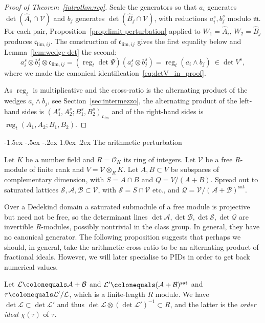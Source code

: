\documentclass[11pt,a4paper]{amsart}
\makeatletter
\renewcommand\subsection{\@startsection{subsection}{2}{\z@}
                                   {-1.5ex \@plus -.5ex \@minus -.2ex}%
                                   {1.0ex \@plus.2ex}%
                                   {\normalfont\itshape}}%
\newcommand{\xc}{\mathfrak{c}}
\newcommand{\xm}{\mathfrak{m}}
\DeclareMathOperator{\reg}{reg}
\newcommand{\sat}{{\operatorname{sat}}}
\theoremstyle{plain}
\theoremstyle{definition}
\theoremstyle{remark}
\newcommand{\ca}{\mathcal{A}}
\newcommand{\cb}{\mathcal{B}}
\newcommand{\cl}{\mathcal{L}}
\newcommand{\co}{\mathcal{O}}
\newcommand{\cq}{\mathcal{Q}}
\newcommand{\cs}{\mathcal{S}}
\newcommand{\cv}{\mathcal{V}}
\newcommand{\coleq}{\colonequals}
\newcommand{\xci}[1][]{\xc_{\mathrm{lim}#1}} %
\makeatother
\begin{document}
\begin{proof}[Proof of Theorem~\ref{introthm:reg}]
  Scale the generators so that $a_i$ generates $\det(\hat A_i \cap \cv)$ and $b_j$ generates
  $\det(\hat B_j \cap \cv)$, with reductions $a_i^s, b_j^s$ modulo $\xm$. For each pair,
  Proposition~\ref{prop:limit-perturbation} applied to $W_1 = \hat A_i$, $W_2 = \hat B_j$ produces
  $\xci[,ij]$. The construction of $\xci[,ij]$ gives the first equality below and Lemma~\ref{lem:wedge-det} the second:
  \[
    a_i^s \otimes b_j^s \otimes \xci[,ij] = (\reg_t \det \Psi)(a_i^s \otimes b_j^s) = \reg_t(a_i \wedge b_j) \ \in \det V^s,
  \]
  where we made the canonical identification~\eqref{eq:detV_in_proof}.

  As $\reg_t$ is multiplicative and the cross-ratio is the alternating product of the wedges $a_i \wedge b_j$, see Section~\ref{sec:intermezzo}, the alternating product of the left-hand sides is $(A_1^s, A_2^s; B_1^s, B_2^s)_{\xci}$ and of the right-hand sides is $\reg_t(A_1, A_2; B_1, B_2)$.
\end{proof}

\subsection{The arithmetic perturbation}

Let $K$ be a number field and $R = \co_K$ its ring of integers. Let $\cv$ be a free $R$-module of finite rank and $V = \cv \otimes_R K$. Let $A, B \subset V$ be subspaces of complementary dimension, with $S = A \cap B$ and $Q = V/(A+B)$. Spread out to saturated lattices $\cs, \ca, \cb \subset \cv$, with $\cs = S \cap \cv$ etc., and $\cq = \cv/(\ca + \cb)^{\sat}$.

Over a Dedekind domain a saturated submodule of a free module is projective but need not be free, so the determinant lines $\det \ca, \det \cb, \det \cs, \det \cq$ are invertible $R$-modules, possibly nontrivial in the class group. In general, they have no canonical generator. The following proposition suggests that perhaps we should, in general, take the arithmetic cross-ratio to be an alternating product of fractional ideals. However, we will later specialise to PIDs in order to get back numerical values.

Let $\cl \coleq \ca + \cb$ and $\cl' \coleq (\ca + \cb)^{\sat}$ and $\tau \coleq \cl'/\cl$, which is a finite-length $R$ module. We have $ \det \cl \subset \det \cl'$ and thus $\det \cl \otimes (\det \cl')^{-1} \subset R$, and the latter is the \emph{order ideal} $\chi(\tau)$ of $\tau$.
\end{document}
